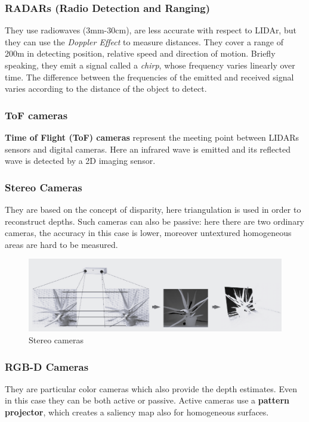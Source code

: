 \subsubsection{RADARs (Radio Detection and Ranging)}
They use radiowaves (3mm-30cm), are less accurate with respect to LIDAr, but they can use the \textit{Doppler Effect} to measure distances. They cover a range of 200m in detecting position, relative speed and direction of motion. Briefly speaking, they emit a signal called a \textit{chirp}, whose frequency varies linearly over time. The difference between the frequencies of the emitted and received signal  varies according to the distance of the object to detect.

\subsubsection{ToF cameras}
\textbf{Time of Flight (ToF) cameras} represent the meeting point between LIDARs sensors and digital cameras. Here an infrared wave is emitted and its reflected wave is detected by a 2D imaging sensor. 


\subsubsection{Stereo Cameras}
They are based on the concept of disparity, here triangulation is used in order to reconstruct depths. Such cameras can also be passive: here there are two ordinary cameras, the accuracy in this case is lower, moreover untextured homogeneous areas are hard to be measured.

\begin{figure}[h]
    \centering
    \includegraphics[scale=0.6]{img/stereo_camers.png}
    \caption{Stereo cameras}
\end{figure}

\subsubsection{RGB-D Cameras}
They are particular color cameras which also provide the depth estimates. Even in this case they can be both active or passive. Active cameras use a \textbf{pattern projector}, which creates a saliency map also for homogeneous surfaces.

